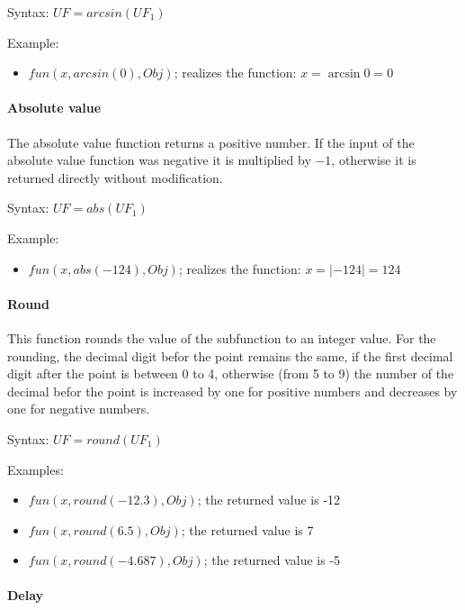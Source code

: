 \bigskip\noindent
Syntax:
$UF=arcsin( UF_1 )$

\bigskip\noindent
Example:
\begin{itemize}
 \item $fun(x, arcsin(0), Obj)$; realizes the function: $x=\arcsin{0}=0$
\end{itemize}


\paragraph{Absolute value}

The absolute value function returns a positive number. If the input of the absolute value function was negative it is multiplied by $-1$, otherwise it is returned directly without modification.

\bigskip\noindent
Syntax:
$UF=abs( UF_1 )$

\bigskip\noindent
Example:
\begin{itemize}
 \item $fun(x, abs(-124), Obj)$; realizes the function: $x=|-124|=124$
\end{itemize}


\paragraph{Round}

This function rounds the value of the subfunction to an integer value.
For the rounding, the decimal digit befor the point remains the same, if the first decimal digit after the point is between 0 to 4, otherwise (from 5 to 9) the number of the decimal befor the point is increased by one for positive numbers and decreases by one for negative numbers.

\bigskip\noindent
Syntax:
$UF=round( UF_1 )$

\bigskip\noindent
Examples:
\begin{itemize}
 \item $fun(x, round(-12.3), Obj)$; the returned value is -12
 \item $fun(x, round(6.5), Obj)$; the returned value is 7
 \item $fun(x, round(-4.687), Obj)$; the returned value is -5
\end{itemize}


\paragraph{Delay}

